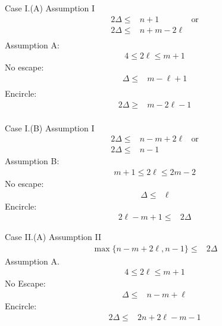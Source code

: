 \documentclass[letterpaper, 10pt]{article}
\begin{document}
\theoremstyle{definition}
\newtheorem{definition}{Definition}
\newtheorem{theorem}{Theorem}
\newtheorem{proposition}{Proposition}
\newtheorem{corollary}{Corollary}
\newtheorem{lemma}{Lemma}
\newtheorem{proofpart}{Part}
\makeatletter
{}
\makeatother

{ \color{red} Case I.(A)
 Assumption I
 \begin{align*}
  2 \Delta \leq & n+1         & \text{or} \\
  2 \Delta \leq & n+m -2 \ell             \\
 \end{align*}
 Assumption A:
 \begin{align*}
  4 \leq 2 \ell \leq m + 1
 \end{align*} }
{ \color{blue}
 No escape:
 \begin{align*}
  \Delta \leq & m- \ell + 1 \\
 \end{align*}
 Encircle:
 \begin{align*}
  2 \Delta \geq & m - 2\ell  -1 \\
 \end{align*} }

{ \color{red} Case I.(B)
 Assumption I
 \begin{align*}
  2 \Delta \leq & n - m + 2 \ell & \text{or} \\
  2 \Delta \leq & n - 1
 \end{align*}
 Assumption B:
 \begin{align*}
  m + 1 \leq 2 \ell \leq 2m - 2
 \end{align*} }
{ \color{blue}
 No escape:
 \begin{align*}
  \Delta \leq & \ell
 \end{align*}
 Encircle:
 \begin{align*}
  2\ell - m + 1 \leq & 2 \Delta
 \end{align*} }

{ \color{red} Case II.(A)
 Assumption II
 \begin{align*}
  \max\{ n -m + 2\ell, n-1 \} \leq & 2 \Delta
 \end{align*}
 Assumption A.
 \begin{align*}
  4 \leq 2 \ell \leq m + 1
 \end{align*} }
{\color{blue}
 No Escape:
 \begin{align*}
  \Delta \leq & n - m + \ell
 \end{align*}
 Encircle:
 \begin{align*}
  2 \Delta \leq & 2n + 2\ell - m - 1
 \end{align*} }
\end{document}
